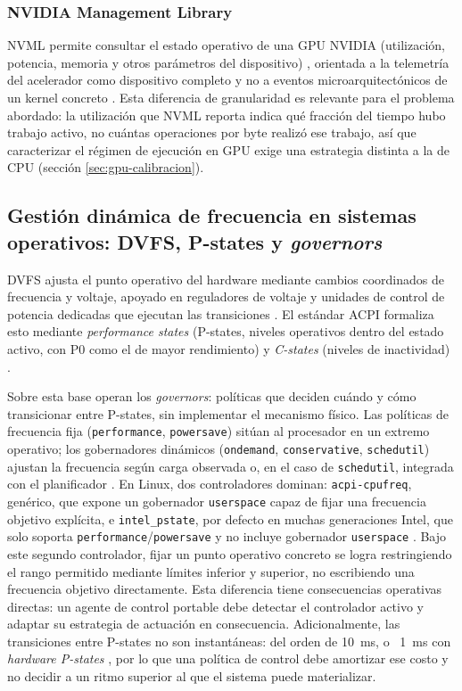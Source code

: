 \documentclass[12pt,oneside,spanish]{book}
\begin{document}
\subsubsection{NVIDIA Management Library}

NVML permite consultar el estado operativo de una GPU NVIDIA (utilización, potencia, memoria y otros parámetros del dispositivo) \cite{NVML2026}, orientada a la telemetría del acelerador como dispositivo completo y no a eventos microarquitectónicos de un kernel concreto \cite{Calore2017,NVML2026}. Esta diferencia de granularidad es relevante para el problema abordado: la utilización que NVML reporta indica qué fracción del tiempo hubo trabajo activo, no cuántas operaciones por byte realizó ese trabajo, así que caracterizar el régimen de ejecución en GPU exige una estrategia distinta a la de CPU (sección \ref{sec:gpu-calibracion}).

\subsection{Gestión dinámica de frecuencia en sistemas operativos: DVFS, P-states y \textit{governors}}

DVFS ajusta el punto operativo del hardware mediante cambios coordinados de frecuencia y voltaje, apoyado en reguladores de voltaje y unidades de control de potencia dedicadas que ejecutan las transiciones \cite{Hebbar2022}. El estándar ACPI formaliza esto mediante \textit{performance states} (P-states, niveles operativos dentro del estado activo, con P0 como el de mayor rendimiento) y \textit{C-states} (niveles de inactividad) \cite{Hebbar2022,Gregg2020}.

Sobre esta base operan los \textit{governors}: políticas que deciden cuándo y cómo transicionar entre P-states, sin implementar el mecanismo físico. Las políticas de frecuencia fija (\texttt{performance}, \texttt{powersave}) sitúan al procesador en un extremo operativo; los gobernadores dinámicos (\texttt{ondemand}, \texttt{conservative}, \texttt{schedutil}) ajustan la frecuencia según carga observada o, en el caso de \texttt{schedutil}, integrada con el planificador \cite{Hebbar2022}. En Linux, dos controladores dominan: \texttt{acpi-cpufreq}, genérico, que expone un gobernador \texttt{userspace} capaz de fijar una frecuencia objetivo explícita, e \texttt{intel\_pstate}, por defecto en muchas generaciones Intel, que solo soporta \texttt{performance}/\texttt{powersave} y no incluye gobernador \texttt{userspace} \cite{Hebbar2022}. Bajo este segundo controlador, fijar un punto operativo concreto se logra restringiendo el rango permitido mediante límites inferior y superior, no escribiendo una frecuencia objetivo directamente. Esta diferencia tiene consecuencias operativas directas: un agente de control portable debe detectar el controlador activo y adaptar su estrategia de actuación en consecuencia. Adicionalmente, las transiciones entre P-states no son instantáneas: del orden de 10~ms, o ~1~ms con \textit{hardware P-states} \cite{Hebbar2022}, por lo que una política de control debe amortizar ese costo y no decidir a un ritmo superior al que el sistema puede materializar.
\end{document}
